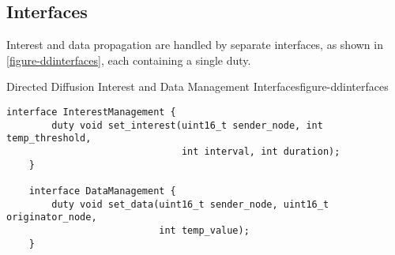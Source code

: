 \begin{comment}
  \begin{mathpar}
    \code{FEMA.tempControllers} \leftarrow \code{V}

    \code{V.tempUsers} \leftarrow \code{A}
  \end{mathpar}

  These certificates prove that \code{A} is a \code{tempUser} according
  to at least one FEMA certified \code{tempController}. Similarly the
  Burlington city fire department protects its temperature sensing
  application using the governing role \code{B.t}. Its nodes are
  deployed with a similar policy statement and with certificates showing
  that \code{B} is a member of \code{V.tempUsers}.

  If both fire departments are called upon to work together fighting a
  large fire, their sensor networks will now be able to interoperate,
  for purposes of temperature sensing, \emph{with no prior
    coordination.} Furthermore suppose the fire rages out of control and
  the fire department from neighboring Crown Point, New York, \code{C}
  is called in to assist. The new nodes introduced by \code{C} will also
  be able to interoperate with both sets of existing nodes provided they
  are deployed with certificates such as the following, where \code{N}
  is the \RT\ entity of the state of New York:

  \begin{mathpar}
    \code{FEMA.tempControllers} \leftarrow \code{N}

    \code{N.tempUsers} \leftarrow \code{C}
  \end{mathpar}

  In our example we implemented the program for the Addison town fire
  department. However, the other programs are identical, from the point
  of view of temperature sensing, except for changes in the governing
  role on the remote services and changes in the deployed policy and
  certificates.
\end{comment}

\subsection{Interfaces}

Interest and data propagation are handled by separate interfaces, as
shown in \autoref{figure-ddinterfaces}, each containing a single duty.

\begin{fpfig}[!t]{Directed Diffusion Interest and Data Management Interfaces}{figure-ddinterfaces}
{
\vspace{0.6em}
\begin{Verbatim}[fontsize=\small]
    interface InterestManagement {
        duty void set_interest(uint16_t sender_node, int temp_threshold, 
                               int interval, int duration);
    }

    interface DataManagement {
        duty void set_data(uint16_t sender_node, uint16_t originator_node, 
                           int temp_value);
    }
\end{Verbatim}
\vspace{0.3em}
}
\end{fpfig}

